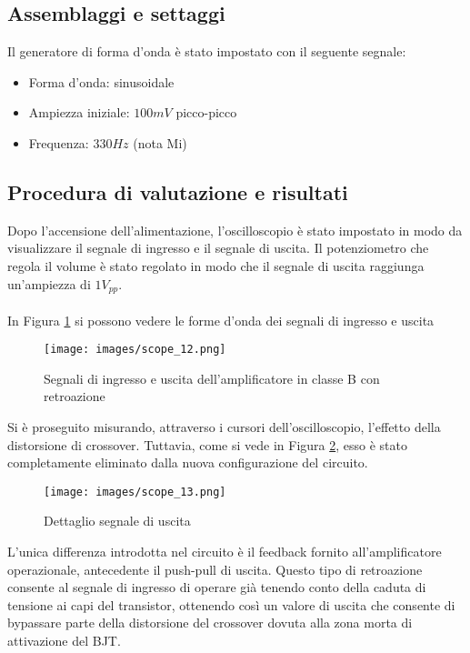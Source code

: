 \subsection{Assemblaggi e settaggi}
Il generatore di forma d'onda è stato impostato con il seguente segnale:
\begin{itemize}
    \item Forma d'onda: sinusoidale
    \item Ampiezza iniziale: $100mV$ picco-picco
    \item Frequenza: $330Hz$ (nota Mi)
\end{itemize}
\subsection{Procedura di valutazione e risultati}
Dopo l'accensione dell'alimentazione, l'oscilloscopio è stato impostato in modo da visualizzare il segnale di ingresso e il segnale di uscita. Il potenziometro che regola il volume è stato regolato in modo che il segnale di uscita raggiunga un'ampiezza di $1V_{pp}$.\\\\
In Figura \ref{fig:scope_12} si possono vedere le forme d'onda dei segnali di ingresso e uscita
\begin{figure}[H]
    \centering
    \texttt{[image: images/scope\_12.png]}
    \caption{Segnali di ingresso e uscita dell'amplificatore in classe B con retroazione}
    \label{fig:scope_12}
\end{figure}
Si è proseguito misurando, attraverso i cursori dell’oscilloscopio, l’effetto della distorsione di crossover. Tuttavia, come si vede in Figura \ref{fig:scope_13}, esso è stato completamente eliminato dalla nuova configurazione del circuito.
\begin{figure}[H]
    \centering
    \texttt{[image: images/scope\_13.png]}
    \caption{Dettaglio segnale di uscita}
    \label{fig:scope_13}
\end{figure}
L’unica differenza introdotta nel circuito è il feedback fornito all’amplificatore operazionale, antecedente il push-pull di uscita. Questo tipo di retroazione consente al segnale di ingresso di operare già tenendo conto della caduta di tensione ai capi del transistor, ottenendo così un valore di uscita che consente di bypassare parte della distorsione del crossover dovuta alla zona morta di attivazione del BJT.